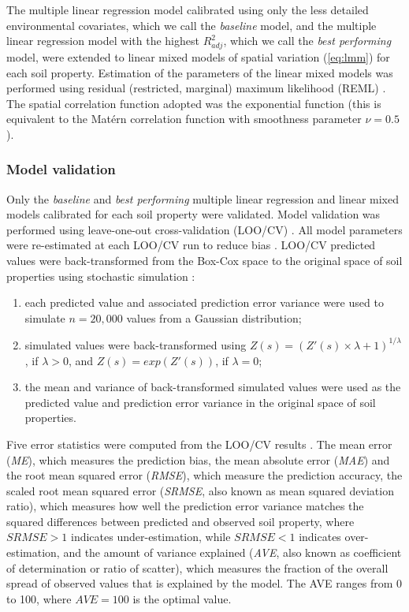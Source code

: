 The multiple linear regression model calibrated using only the less detailed environmental covariates, which we 
call the \textit{baseline} model, and the multiple linear regression model with the highest ${R}^{2}_{adj}$, 
which we call the \textit{best performing} model, were extended to linear mixed models of 
spatial variation (\autoref{eq:lmm}) for each soil property. Estimation of the parameters of the linear mixed 
models was performed using residual (restricted, marginal) maximum likelihood (REML) \cite{RibeiroEtAl2001, 
LarkEtAl2004}. The spatial correlation function adopted was the exponential function (this is equivalent to the 
Matérn correlation function with smoothness parameter $\nu=0.5$ \cite{Stein1999}).

\subsubsection*{Model validation}
\label{subsec:validation}

Only the \textit{baseline} and \textit{best performing} multiple linear regression and linear mixed models 
calibrated for each soil property were validated. Model validation was performed using leave-one-out 
cross-validation (LOO\-/CV) \cite{BrusEtAl2011}. All model parameters were re-estimated at each LOO\-/CV run 
to reduce bias \cite{LaslettEtAl1987}. LOO\-/CV predicted values were back-transformed from the Box-Cox space 
to the original space of soil properties using stochastic simulation \cite{ChristensenEtAl2001}:

\begin{enumerate}
 \item each predicted value and associated prediction error variance were used to simulate $n = 20,000$ values 
from a Gaussian distribution;
\item simulated values were back-transformed using $Z(s) = (Z'(s) \times \lambda + 1)^{1 / \lambda}$, if 
$\lambda > 0$, and $Z(s) = exp(Z'(s))$, if $\lambda = 0$;
 \item the mean and variance of back-transformed simulated values were used as the predicted value and 
prediction error variance in the original space of soil properties.
\end{enumerate}

Five error statistics were computed from the LOO\-/CV results \cite{JanssenEtAl1995, KempenEtAl2010, 
BrusEtAl2011}. The mean error (\textit{ME}), which measures the prediction bias, the mean absolute error 
(\textit{MAE}) and the root mean squared error (\textit{RMSE}), which measure the prediction accuracy, the 
scaled root mean squared error (\textit{SRMSE}, also known as mean squared deviation ratio), which measures how 
well the prediction error variance matches the squared differences between predicted and observed soil 
property, where $\textit{SRMSE}>1$ indicates under-estimation, while $\textit{SRMSE}<1$ indicates 
over-estimation, and the amount of variance explained (\textit{AVE}, also known as coefficient of determination 
or ratio of scatter), which measures the fraction of the overall spread of observed values that is explained by 
the model. The AVE ranges from 0 to 100, where $\textit{AVE}=100$ is the optimal value.

